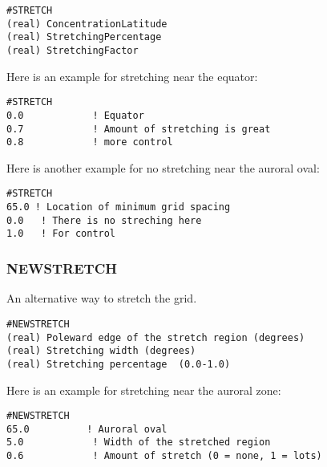 \begin{verbatim}
#STRETCH
(real) ConcentrationLatitude 
(real) StretchingPercentage 
(real) StretchingFactor  
\end{verbatim}

Here is an example for stretching near the equator:

\begin{verbatim}
#STRETCH
0.0            ! Equator
0.7            ! Amount of stretching is great
0.8            ! more control
\end{verbatim}

Here is another example for no stretching near the auroral oval:

\begin{verbatim}
#STRETCH
65.0 ! Location of minimum grid spacing
0.0	  ! There is no streching here
1.0   ! For control
\end{verbatim}

\subsubsection{NEWSTRETCH}
\label{newstretch.sec}

An alternative way to stretch the grid.

\begin{verbatim}
#NEWSTRETCH
(real) Poleward edge of the stretch region (degrees) 
(real) Stretching width (degrees)
(real) Stretching percentage  (0.0-1.0)
\end{verbatim}

Here is an example for stretching near the auroral zone:

\begin{verbatim}
#NEWSTRETCH
65.0          ! Auroral oval
5.0            ! Width of the stretched region
0.6            ! Amount of stretch (0 = none, 1 = lots)
\end{verbatim}
